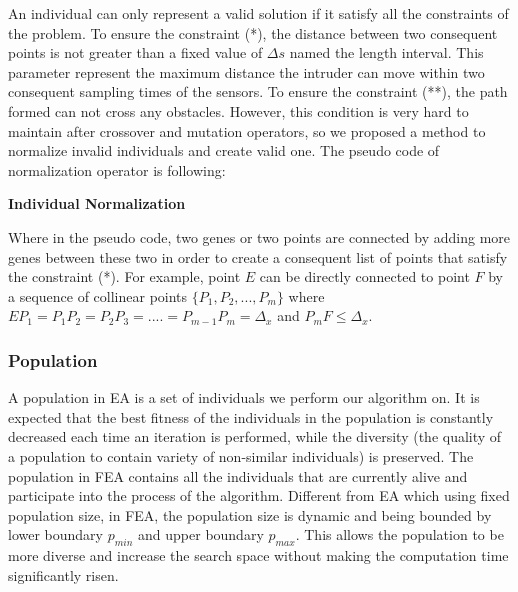 \documentclass[final]{elsarticle}
\begin{document}
An individual can only represent a valid solution if it satisfy all the constraints of the problem. To ensure the constraint (*), the distance between two consequent points is not greater than a fixed value of $\Delta s$ named the length interval. This parameter represent the maximum distance the intruder can move within two consequent sampling times of the sensors. To ensure the constraint (**), the path formed can not cross any obstacles. However, this condition is very hard to maintain after crossover and mutation operators, so we proposed a method to normalize invalid individuals and create valid one. The pseudo code of normalization operator is following:
\begin{algorithm}[H]
	\SetAlgoLined
		\caption{\textbf{Individual Normalization}} 
		\label{alg.0}
\end{algorithm} 
Where in the pseudo code, two genes or two points are connected by adding more genes between these two in order to create a consequent list of points that satisfy the constraint (*). For example, point $ E $ can be directly connected to point $ F $ by a sequence of collinear points $\{P_1,P_2,...,P_m\}$ where $EP_1=P_1P_2=P_2P_3=....=P_{m-1}P_m=\Delta_x$ and $P_mF \leq \Delta_x$.\\

\subsubsection{Population}

A population in EA is a set of individuals we perform our algorithm on. It is expected that the best fitness of the individuals in the population is constantly decreased each time an iteration is performed, while the diversity (the quality of a population to contain variety of non-similar individuals) is preserved. The population in FEA contains all the individuals that are currently alive and participate into the process of the algorithm. Different from EA which using fixed population size, in FEA, the population size is dynamic and being bounded by lower boundary $p_{min}$ and upper boundary $p_{max}$. This allows the population to be more diverse and increase the search space without making the computation time significantly risen.
\end{document}
